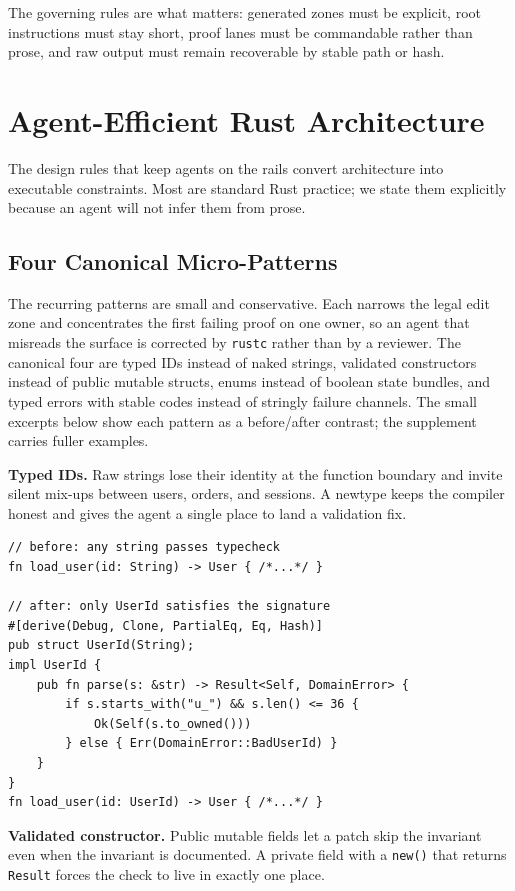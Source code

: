 \documentclass[conference]{IEEEtran}
\begin{document}
The governing rules are what matters: generated zones must be explicit, root instructions must stay short, proof lanes must be commandable rather than prose, and raw output must remain recoverable by stable path or hash.

\section{Agent-Efficient Rust Architecture}
\label{sec:design}
The design rules that keep agents on the rails convert architecture into executable constraints. Most are standard Rust practice; we state them explicitly because an agent will not infer them from prose.

\subsection{Four Canonical Micro-Patterns}
The recurring patterns are small and conservative. Each narrows the legal edit zone and concentrates the first failing proof on one owner, so an agent that misreads the surface is corrected by \texttt{rustc} rather than by a reviewer. The canonical four are typed IDs instead of naked strings, validated constructors instead of public mutable structs, enums instead of boolean state bundles, and typed errors with stable codes instead of stringly failure channels. The small excerpts below show each pattern as a before/after contrast; the supplement carries fuller examples.

\noindent\textbf{Typed IDs.} Raw strings lose their identity at the function boundary and invite silent mix-ups between users, orders, and sessions. A newtype keeps the compiler honest and gives the agent a single place to land a validation fix.

\begin{lstlisting}[style=rustcode,caption={Typed ID: before and after},label={lst:typed-id}]
// before: any string passes typecheck
fn load_user(id: String) -> User { /*...*/ }

// after: only UserId satisfies the signature
#[derive(Debug, Clone, PartialEq, Eq, Hash)]
pub struct UserId(String);
impl UserId {
    pub fn parse(s: &str) -> Result<Self, DomainError> {
        if s.starts_with("u_") && s.len() <= 36 {
            Ok(Self(s.to_owned()))
        } else { Err(DomainError::BadUserId) }
    }
}
fn load_user(id: UserId) -> User { /*...*/ }
\end{lstlisting}

\noindent\textbf{Validated constructor.} Public mutable fields let a patch skip the invariant even when the invariant is documented. A private field with a \texttt{new()} that returns \texttt{Result} forces the check to live in exactly one place.
\end{document}
